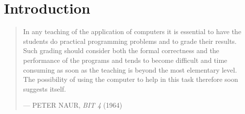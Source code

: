 
\chapter{Introduction}

\begin{quotation}

\footnotesize\sffamily\itshape

\begin{flushright}

In any teaching of the application of computers it is essential to have the
students do practical programming problems and to grade their results. Such
grading should consider both the formal correctness and the performance of the
programs and tends to become difficult and time consuming as soon as the
teaching is beyond the most elementary level.  The possibility of using the
computer to help in this task therefore soon suggests itself.

\smallbreak

\upshape

--- PETER NAUR, {\itshape BIT 4} (1964)

\end{flushright}

\end{quotation}
